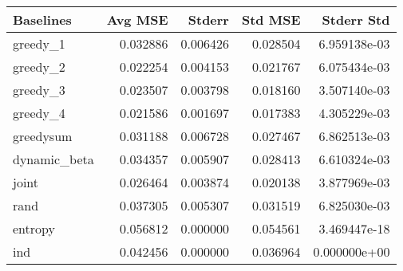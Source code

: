 \begin{tabular}{lrrrr}
\toprule
    Baselines &   Avg MSE &    Stderr &   Std MSE &    Stderr Std \\
\midrule
     greedy\_1 &  0.032886 &  0.006426 &  0.028504 &  6.959138e-03 \\
     greedy\_2 &  0.022254 &  0.004153 &  0.021767 &  6.075434e-03 \\
     greedy\_3 &  0.023507 &  0.003798 &  0.018160 &  3.507140e-03 \\
     greedy\_4 &  0.021586 &  0.001697 &  0.017383 &  4.305229e-03 \\
   greedysum &  0.031188 &  0.006728 &  0.027467 &  6.862513e-03 \\
 dynamic\_beta &  0.034357 &  0.005907 &  0.028413 &  6.610324e-03 \\
        joint &  0.026464 &  0.003874 &  0.020138 &  3.877969e-03 \\
         rand &  0.037305 &  0.005307 &  0.031519 &  6.825030e-03 \\
      entropy &  0.056812 &  0.000000 &  0.054561 &  3.469447e-18 \\
          ind &  0.042456 &  0.000000 &  0.036964 &  0.000000e+00 \\
\bottomrule
\end{tabular}
